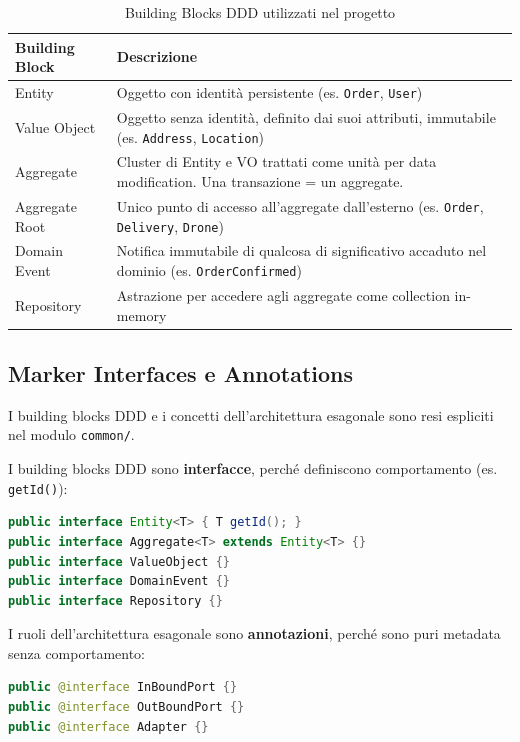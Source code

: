 \documentclass[12pt,a4paper]{article}
\begin{document}
\begin{table}[H]
\centering
\begin{tabularx}{\textwidth}{lX}
\toprule
\textbf{Building Block} & \textbf{Descrizione} \\
\midrule
Entity & Oggetto con identit\`a persistente (es. \texttt{Order}, \texttt{User}) \\
Value Object & Oggetto senza identit\`a, definito dai suoi attributi, immutabile (es. \texttt{Address}, \texttt{Location}) \\
Aggregate & Cluster di Entity e VO trattati come unit\`a per data modification. Una transazione = un aggregate. \\
Aggregate Root & Unico punto di accesso all'aggregate dall'esterno (es. \texttt{Order}, \texttt{Delivery}, \texttt{Drone}) \\
Domain Event & Notifica immutabile di qualcosa di significativo accaduto nel dominio (es. \texttt{OrderConfirmed}) \\
Repository & Astrazione per accedere agli aggregate come collection in-memory \\
\bottomrule
\end{tabularx}
\caption{Building Blocks DDD utilizzati nel progetto}
\end{table}

\subsection{Marker Interfaces e Annotations}

I building blocks DDD e i concetti dell'architettura esagonale sono resi espliciti nel modulo \texttt{common/}.

I building blocks DDD sono \textbf{interfacce}, perch\'e definiscono comportamento (es. \texttt{getId()}):

\begin{lstlisting}[language=Java]
public interface Entity<T> { T getId(); }
public interface Aggregate<T> extends Entity<T> {}
public interface ValueObject {}
public interface DomainEvent {}
public interface Repository {}
\end{lstlisting}

I ruoli dell'architettura esagonale sono \textbf{annotazioni}, perch\'e sono puri metadata senza comportamento:

\begin{lstlisting}[language=Java]
public @interface InBoundPort {}
public @interface OutBoundPort {}
public @interface Adapter {}
\end{lstlisting}
\end{document}
